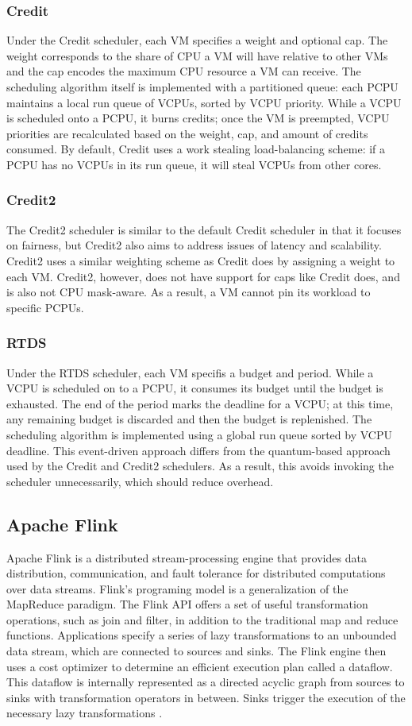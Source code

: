 \documentclass{article}
\begin{document}
\subsubsection{Credit}
Under the Credit scheduler, each VM specifies a weight and optional cap. The weight corresponds to the share of CPU a VM will have relative to other VMs and the cap encodes the maximum CPU resource a VM can receive. The scheduling algorithm itself is implemented with a partitioned queue: each PCPU maintains a local run queue of VCPUs, sorted by VCPU priority. While a VCPU is scheduled onto a PCPU, it burns credits; once the VM is preempted, VCPU priorities are recalculated based on the weight, cap, and amount of credits consumed. By default, Credit uses a work stealing load-balancing scheme: if a PCPU has no VCPUs in its run queue, it will steal VCPUs from other cores. 
\subsubsection{Credit2}
The Credit2 scheduler is similar to the default Credit scheduler in that it focuses on fairness, but Credit2 also aims to address issues of latency and scalability. Credit2 uses a similar weighting scheme as Credit does by assigning a weight to each VM. Credit2, however, does not have support for caps like Credit does, and is also not CPU mask-aware. As a result, a VM cannot pin its workload to specific PCPUs. 
\subsubsection{RTDS}
Under the RTDS scheduler, each VM specifis a budget and period. While a VCPU is scheduled on to a PCPU, it consumes its budget until the budget is exhausted. The end of the period marks the deadline for a VCPU; at this time, any remaining budget is discarded and then the budget is replenished. The scheduling algorithm is implemented using a global run queue sorted by VCPU deadline. This event-driven approach differs from the quantum-based approach used by the Credit and Credit2 schedulers. As a result, this avoids invoking the scheduler unnecessarily, which should reduce overhead. 
\subsection{Apache Flink}
Apache Flink is a distributed stream-processing engine that provides data distribution, communication, and fault tolerance for distributed computations over data streams. Flink's programing model is a generalization of the MapReduce paradigm. The Flink API offers a set of useful transformation operations, such as join and filter, in addition to the traditional map and reduce functions. Applications specify a series of lazy transformations to an unbounded data stream, which are connected to sources and sinks. The Flink engine then uses a cost optimizer to determine an efficient execution plan called a dataflow. This dataflow is internally represented as a directed acyclic graph from sources to sinks with transformation operators in between. Sinks trigger the execution of the necessary lazy transformations \citep{DBLP:journals/corr/abs-1803-10836}.
\end{document}
